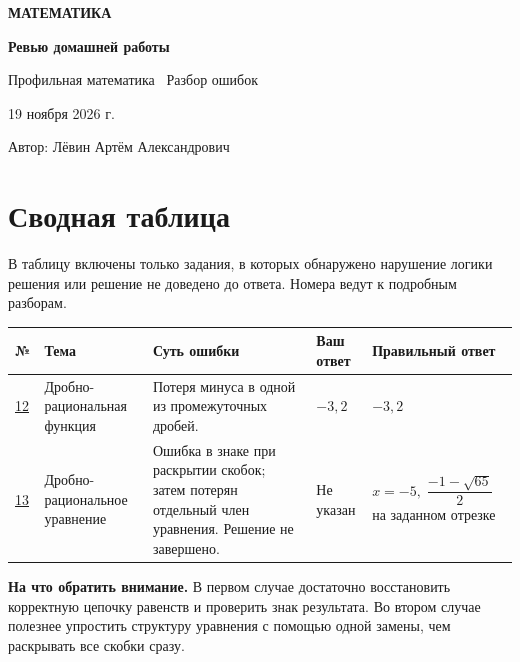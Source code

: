 \documentclass[a4paper,12pt]{article}
\begin{document}
\thispagestyle{empty}
\begin{center}
\vspace*{45mm}
{\large\color{accent}\textbf{МАТЕМАТИКА}}\par
\vspace{17mm}
{\fontsize{26}{31}\selectfont\bfseries\color{ink}Ревью домашней работы}\par
\vspace{8mm}
{\large\color{muted}Профильная математика \textbullet\ Разбор ошибок}\par
\vspace{22mm}
{\normalsize 19 ноября 2026 г.}\par
\vspace{6mm}
{\normalsize Автор: Лёвин Артём Александрович}\par
\vfill
{}
\vspace{11mm}
\end{center}
\clearpage

\section*{Сводная таблица}
В таблицу включены только задания, в которых обнаружено нарушение логики решения или решение не доведено до ответа. Номера ведут к подробным разборам.
\vspace{4mm}
\renewcommand{\arraystretch}{1.48}
\setlength{\tabcolsep}{4pt}
\small
\begin{tabularx}{\linewidth}{@{}p{11mm}p{23mm}X p{24mm}p{29mm}@{}}
\toprule
\textbf{№} & \textbf{Тема} & \textbf{Суть ошибки} & \textbf{Ваш ответ} & \textbf{Правильный ответ} \\
\midrule
\hyperref[task:12]{12} & Дробно-рациональная функция & Потеря минуса в одной из промежуточных дробей. & $-3{,}2$ & $-3{,}2$ \\
\hyperref[task:13]{13} & Дробно-рациональное уравнение & Ошибка в знаке при раскрытии скобок; затем потерян отдельный член уравнения. Решение не завершено. & Не указан & $x=-5,\;\dfrac{-1-\sqrt{65}}{2}$ на заданном отрезке \\
\bottomrule
\end{tabularx}
\normalsize
\vspace{10mm}
\textbf{На что обратить внимание.} В первом случае достаточно восстановить корректную цепочку равенств и проверить знак результата. Во втором случае полезнее упростить структуру уравнения с помощью одной замены, чем раскрывать все скобки сразу.
\clearpage
\end{document}
